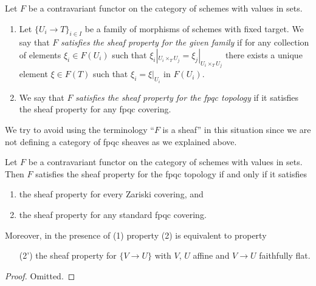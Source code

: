 \begin{definition}
\label{definition-sheaf-property-fpqc}
Let $F$ be a contravariant functor on the category
of schemes with values in sets.
\begin{enumerate}
\item Let $\{U_i \to T\}_{i \in I}$ be a family of morphisms
of schemes with fixed target.
We say that $F$ {\it satisfies the sheaf property for the given family}
if for any collection of elements $\xi_i \in F(U_i)$ such that
$\xi_i|_{U_i \times_T U_j} = \xi_j|_{U_i \times_T U_j}$
there exists a unique element
$\xi \in F(T)$ such that $\xi_i = \xi|_{U_i}$ in $F(U_i)$.
\item We say that $F$ {\it satisfies the sheaf property for the
fpqc topology} if it satisfies the sheaf property for any
fpqc covering.
\end{enumerate}
\end{definition}

\noindent
We try to avoid using the terminology ``$F$ is a sheaf'' in this
situation since we are not defining a category of fpqc sheaves
as we explained above.

\begin{lemma}
\label{lemma-sheaf-property-fpqc}
Let $F$ be a contravariant functor on the category
of schemes with values in sets. Then $F$ satisfies
the sheaf property for the fpqc topology if and only
if it satisfies
\begin{enumerate}
\item the sheaf property for every Zariski covering, and
\item the sheaf property for any standard fpqc covering.
\end{enumerate}
Moreover, in the presence of (1) property (2) is equivalent to
property
\begin{enumerate}
\item[(2')] the sheaf property for $\{V \to U\}$
with $V$, $U$ affine and $V \to U$ faithfully flat.
\end{enumerate}
\end{lemma}

\begin{proof}
Omitted.
\end{proof}




























